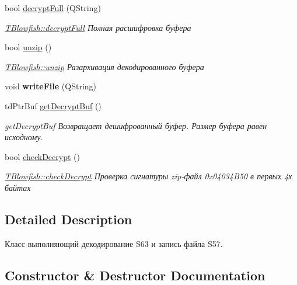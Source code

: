 \begin{DoxyCompactItemize}
bool \hyperlink{classblowfish_lib_1_1_t_blowfish_aa6cf535926e4a3daae058725a6192619}{decrypt\+Full} (Q\+String)
\begin{DoxyCompactList}\small\item\em \hyperlink{classblowfish_lib_1_1_t_blowfish_aa6cf535926e4a3daae058725a6192619}{T\+Blowfish\+::decrypt\+Full} Полная расшифровка буфера \end{DoxyCompactList}\item 
bool \hyperlink{classblowfish_lib_1_1_t_blowfish_a17896279118b13a237ab31c1cb82da26}{unzip} ()
\begin{DoxyCompactList}\small\item\em \hyperlink{classblowfish_lib_1_1_t_blowfish_a17896279118b13a237ab31c1cb82da26}{T\+Blowfish\+::unzip} Разархивация декодированного буфера \end{DoxyCompactList}\item 
\mbox{\label{classblowfish_lib_1_1_t_blowfish_a0e634baff0aba9677a41c58c01a6b25a}} 
void {\bfseries write\+File} (Q\+String)
\item 
td\+Ptr\+Buf \hyperlink{classblowfish_lib_1_1_t_blowfish_ab1f9fc3cc9b075c3b9b558b5719c159e}{get\+Decrypt\+Buf} ()
\begin{DoxyCompactList}\small\item\em get\+Decrypt\+Buf Возвращает дешифрованный буфер. Размер буфера равен исходному. \end{DoxyCompactList}\item 
bool \hyperlink{classblowfish_lib_1_1_t_blowfish_a53eba59c588fafe24260a0cf05b7866b}{check\+Decrypt} ()
\begin{DoxyCompactList}\small\item\em \hyperlink{classblowfish_lib_1_1_t_blowfish_a53eba59c588fafe24260a0cf05b7866b}{T\+Blowfish\+::check\+Decrypt} Проверка сигнатуры zip-\/файл 0x04034\+B50 в первых 4х байтах \end{DoxyCompactList}\end{DoxyCompactItemize}


\subsection{Detailed Description}
Класс выполняющий декодирование S63 и запись файла S57. 

\subsection{Constructor \& Destructor Documentation}
\mbox{\label{classblowfish_lib_1_1_t_blowfish_a349e59d7c45d5675376b89def7500c16}} 
